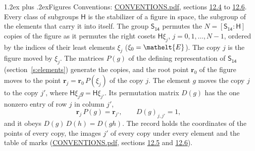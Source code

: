 \documentclass[10pt,a4paper]{article}
\makeatletter
\renewcommand\section{\@startsection{section}{1}{\z@}{-3ex plus -1ex minus -.2ex}%
  {1.2ex plus .2ex}{\normalfont\large\sffamily\bfseries\color{parttitle}}}
\numberwithin{equation}{section}
\newcommand{\eltfont}[1]{{\let\sigma\eltsigma\mathelt{#1}}}
\newcommand{\grp}[1]{\mathsf{#1}}
\newcommand{\cls}[1]{\eltfont{#1}}
\newcommand{\pointr}{\mathbf{r}}
\makeatother
\begin{document}
\section{Figures}\label{s:permutation}
Conventions: \href{../../CONVENTIONS.pdf}{CONVENTIONS.pdf}, sections \href{../../CONVENTIONS.pdf\#conv.12.4}{12.4} to \href{../../CONVENTIONS.pdf\#conv.12.6}{12.6}.
Every class of subgroups $\grp{H}$ is the stabilizer of a figure in space, the subgroup of the elements that carry it into itself. \label{n:local.orbit.size}\label{n:element.coset.least}\label{n:index.coset}The group $\grp{S_{14}}$ permutes the $N = [\grp{S_{14}} : \grp{H}]$ copies of the figure as it permutes the right cosets $\grp{H}\xi_j$, $j = 0, 1, \dots, N - 1$, ordered by the indices of their least elements $\xi_j$ ($\xi_0 = \cls{E}$). The copy $j$ is the figure moved by $\xi_j$. The matrices $P(g)$ of the defining representation of $\grp{S_{14}}$ (section~\ref{s:elements}) generate the copies, and the root point $\pointr_0$ of the figure moves to the point $\pointr_j = \pointr_0\, P(\xi_j)$ of the copy $j$. \label{n:local.coset.image}The element $g$ moves the copy $j$ to the copy $j'$, where $\grp{H}\xi_j g = \grp{H}\xi_{j'}$. \label{n:local.matrix.permutation}Its permutation matrix $D(g)$ has the one nonzero entry of row $j$ in column $j'$,
\begin{equation}\label{e:perm.matrix}\pointr_j\, P(g) = \pointr_{j'}, \qquad D(g)_{j,j'} = 1,\end{equation}
and it obeys $D(g)\, D(h) = D(gh)$. The record holds the coordinates of the points of every copy, the images $j'$ of every copy under every element and the table of marks (\href{../../CONVENTIONS.pdf}{CONVENTIONS.pdf}, sections \href{../../CONVENTIONS.pdf\#conv.12.5}{12.5} and \href{../../CONVENTIONS.pdf\#conv.12.6}{12.6}).
\end{document}
